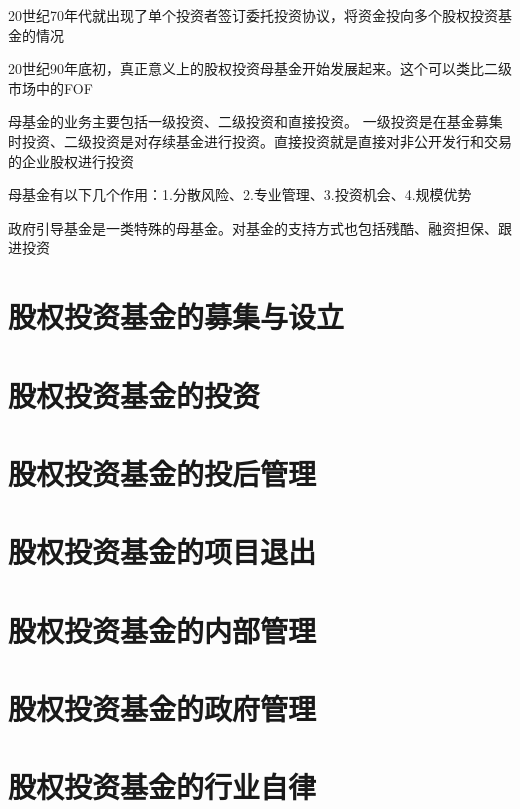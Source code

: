 \documentclass[UTF8,12pt]{ctexbook}
\numberwithin{equation}{section} %
\numberwithin{figure}{section}
\numberwithin{table}{section}
\begin{document}
	20世纪70年代就出现了单个投资者签订委托投资协议，将资金投向多个股权投资基金的情况
	
	20世纪90年底初，真正意义上的股权投资母基金开始发展起来。这个可以类比二级市场中的FOF
	
	母基金的业务主要包括一级投资、二级投资和直接投资。
	一级投资是在基金募集时投资、二级投资是对存续基金进行投资。直接投资就是直接对非公开发行和交易的企业股权进行投资
	
	
	母基金有以下几个作用：1.分散风险、2.专业管理、3.投资机会、4.规模优势
	
	政府引导基金是一类特殊的母基金。对基金的支持方式也包括残酷、融资担保、跟进投资
	
	\section{股权投资基金的募集与设立}
	
	\section{股权投资基金的投资}
	
	\section{股权投资基金的投后管理}
	
	\section{股权投资基金的项目退出}
	
	\section{股权投资基金的内部管理}
	
	\section{股权投资基金的政府管理}
	
	\section{股权投资基金的行业自律}
	
	
	
	
\end{document}

